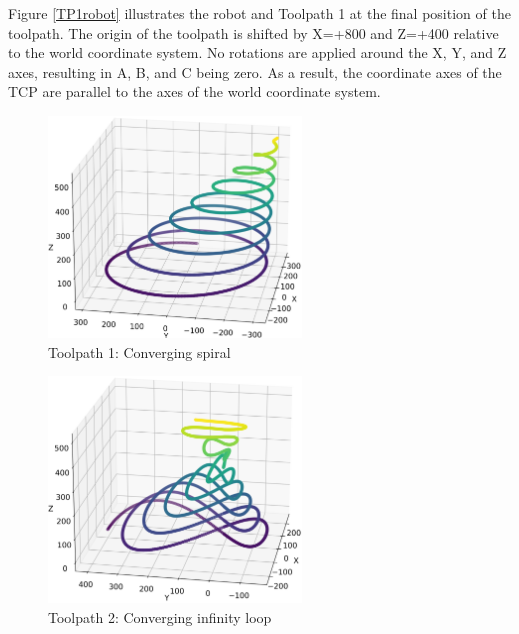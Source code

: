 Figure \ref{TP1robot} illustrates the robot and Toolpath 1 at the final position of the toolpath. The origin of the toolpath is shifted by X=+800 and Z=+400 relative to the world coordinate system. No rotations are applied around the X, Y, and Z axes, resulting in A, B, and C being zero. As a result, the coordinate axes of the \acrshort{TCP} are parallel to the axes of the world coordinate system.

\begin{figure}[H]%
	\centering
	\includegraphics[width=0.6\textwidth]{figures/path1.png}
	\caption{Toolpath 1: Converging spiral}
	\label{path1}
\end{figure}


\begin{figure}[H]%
	\centering
	\includegraphics[width=0.6\textwidth]{figures/path2.png}
	\caption{Toolpath 2: Converging infinity loop}
	\label{path2}
\end{figure}
\newpage




